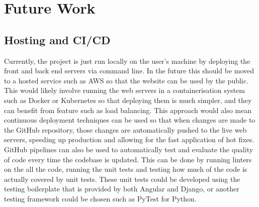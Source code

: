 \section{Future Work}
\subsection*{Hosting and CI/CD}
Currently, the project is just run locally on the user's machine by deploying the front and back end servers via command line. 
In the future this should be moved to a hosted service such as AWS so that the website can be used by the public. This would likely involve 
running the web servers in a containerisation system such as Docker or Kubernetes so that deploying them is much simpler, and they can benefit from 
feature such as load balancing. This approach would also mean continuous deployment techniques can be used so that when changes are made to the 
GitHub repository, those changes are automatically pushed to the live web servers, speeding up production and allowing for the fast application of hot fixes. 
GitHub pipelines can also be used to automatically test and evaluate the quality of code every time the codebase is updated. This can be done by 
running linters on the all the code, running the unit tests and testing how much of the code is actually covered by unit tests. 
These unit tests could be developed using the testing boilerplate that is provided by both Angular and Django, or another testing framework could be chosen 
such as PyTest for Python.

